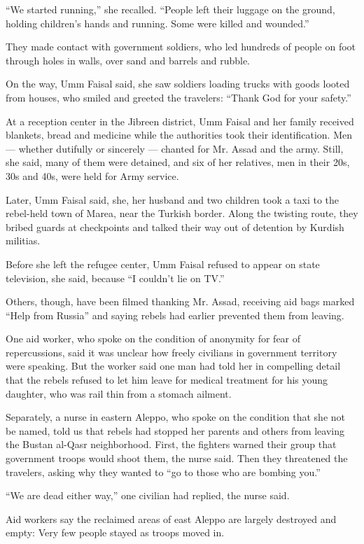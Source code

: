 ``We started running,'' she recalled. ``People left their luggage on the
ground, holding children's hands and running. Some were killed and
wounded.''

They made contact with government soldiers, who led hundreds of people
on foot through holes in walls, over sand and barrels and rubble.

On the way, Umm Faisal said, she saw soldiers loading trucks with goods
looted from houses, who smiled and greeted the travelers: ``Thank God
for your safety.''

At a reception center in the Jibreen district, Umm Faisal and her family
received blankets, bread and medicine while the authorities took their
identification. Men --- whether dutifully or sincerely --- chanted for
Mr. Assad and the army. Still, she said, many of them were detained, and
six of her relatives, men in their 20s, 30s and 40s, were held for Army
service.

Later, Umm Faisal said, she, her husband and two children took a taxi to
the rebel-held town of Marea, near the Turkish border. Along the
twisting route, they bribed guards at checkpoints and talked their way
out of detention by Kurdish militias.

Before she left the refugee center, Umm Faisal refused to appear on
state television, she said, because ``I couldn't lie on TV.''

Others, though, have been filmed thanking Mr. Assad, receiving aid bags
marked ``Help from Russia'' and saying rebels had earlier prevented them
from leaving.

One aid worker, who spoke on the condition of anonymity for fear of
repercussions, said it was unclear how freely civilians in government
territory were speaking. But the worker said one man had told her in
compelling detail that the rebels refused to let him leave for medical
treatment for his young daughter, who was rail thin from a stomach
ailment.

Separately, a nurse in eastern Aleppo, who spoke on the condition that
she not be named, told us that rebels had stopped her parents and others
from leaving the Bustan al-Qasr neighborhood. First, the fighters warned
their group that government troops would shoot them, the nurse said.
Then they threatened the travelers, asking why they wanted to ``go to
those who are bombing you.''

``We are dead either way,'' one civilian had replied, the nurse said.

Aid workers say the reclaimed areas of east Aleppo are largely destroyed
and empty: Very few people stayed as troops moved in.

